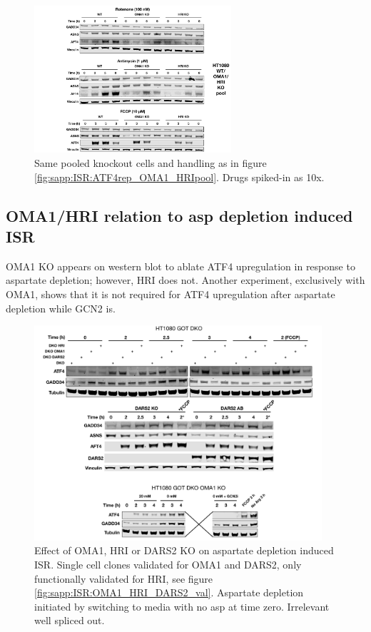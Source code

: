 \begin{figure}[t]
    \centering
    \includegraphics[width=0.65\textwidth]{figures/sapp/ISR/ATF4wes_OMA1_HRIpool.pdf}
    \caption[ATF4 post mito inhib. OMA1/HRI KO, western]{
    Same pooled knockout cells and handling as in figure \ref{fig:sapp:ISR:ATF4rep_OMA1_HRIpool}.
    Drugs spiked-in as 10x.
    }
    \label{fig:sapp:ISR:ATF4wes_OMA1_HRIpool}
\end{figure}






\FloatBarrier
\subsection{OMA1/HRI relation to asp depletion induced ISR}
OMA1 KO appears on western blot to ablate ATF4 upregulation in response to aspartate depletion; however, HRI does not.
Another experiment, exclusively with OMA1, shows that it is not required for ATF4 upregulation after aspartate depletion while GCN2 is.

\begin{figure}
    \centering
    \includegraphics[width=0.95\textwidth]{figures/sapp/ISR/HT1080_DKO_KO_ISR.pdf}
    \caption[ATF4 post Asp depl. OMA1/HRI KO, western]{
    Effect of OMA1, HRI or DARS2 KO on aspartate depletion induced ISR.
    Single cell clones validated for OMA1 and DARS2, only functionally validated for HRI, see figure \ref{fig:sapp:ISR:OMA1_HRI_DARS2_val}.
    Aspartate depletion initiated by switching to media with no asp at time zero.
    Irrelevant well spliced out.
    }
    \label{fig:sapp:ISR:HT1080_DKO_KO_ISR}
\end{figure}

